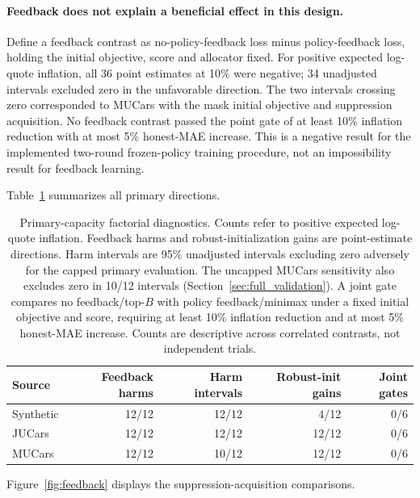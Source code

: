 \documentclass[11pt]{article}
\begin{document}
\paragraph{Feedback does not explain a beneficial effect in this design.}
Define a feedback contrast as no-policy-feedback loss minus policy-feedback
loss, holding the initial objective, score and allocator fixed. For positive
expected log-quote inflation, all 36 point estimates at 10\% were negative;
34 unadjusted intervals excluded zero in the unfavorable direction.
The two intervals crossing zero corresponded to MUCars with the mask initial
objective and suppression acquisition. No feedback contrast passed the point
gate of at least 10\% inflation reduction with at most 5\% honest-MAE increase.
This is a negative result for the implemented two-round frozen-policy training
procedure, not an impossibility result for feedback learning.

Table~\ref{tab:factorial_counts} summarizes all primary directions.
\begin{table}[ht]
\centering\small
\begin{tabular}{lrrrr}
\toprule
Source & Feedback harms & Harm intervals & Robust-init gains & Joint gates\\
\midrule
Synthetic & 12/12 & 12/12 & 4/12 & 0/6\\
JUCars & 12/12 & 12/12 & 12/12 & 0/6\\
MUCars & 12/12 & 10/12 & 12/12 & 0/6\\
\bottomrule
\end{tabular}
\caption{Primary-capacity factorial diagnostics. Counts refer to positive
expected log-quote inflation. Feedback harms and robust-initialization gains
are point-estimate directions. Harm intervals are 95\% unadjusted intervals
excluding zero adversely for the capped primary evaluation. The uncapped
MUCars sensitivity also excludes zero in 10/12 intervals
(Section~\ref{sec:full_validation}). A joint gate compares no feedback/top-$B$ with
policy feedback/minimax under a fixed initial objective and score, requiring
at least 10\% inflation reduction and at most 5\% honest-MAE increase.
Counts are descriptive across correlated contrasts, not independent trials.}
\label{tab:factorial_counts}
\end{table}

Figure~\ref{fig:feedback} displays the suppression-acquisition comparisons.
\end{document}
